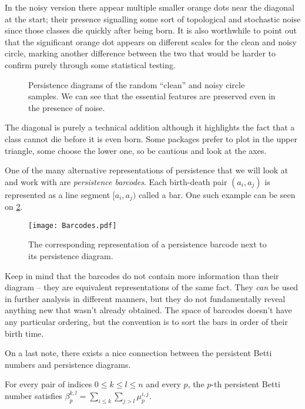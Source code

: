In the noisy version there appear multiple smaller orange dots near the diagonal at the start; their presence signalling some sort of topological and stochastic noise since those classes die quickly after being born. It is also worthwhile to point out that the significant orange dot appears on different scales for the clean and noisy circle, marking another difference between the two that would be harder to confirm purely through some statistical testing.

\begin{figure}
    \centering
    \qquad
    \caption{Persistence diagrams of the random ``clean'' and noisy circle samples. We can see that the essential features are preserved even in the presence of noise.}
    \label{fig:clean_noisy_homologies}
\end{figure}

The diagonal is purely a technical addition although it highlights the fact that a class cannot die before it is even born. Some packages prefer to plot in the upper triangle, some choose the lower one, so be cautious and look at the axes.

One of the many alternative representations of persistence that we will look at and work with are \textit{persistence barcodes}. Each birth-death pair $(a_{i}, a_{j})$ is represented as a line segment $[a_{i}, a_{j})$ called a bar. One such example can be seen on \ref{fig:barcodes}.

\begin{figure}[h!]
  \centering
  \texttt{[image: Barcodes.pdf]}
  \caption{The corresponding representation of a persistence barcode next to its persistence diagram.}
  \label{fig:barcodes}
\end{figure}

Keep in mind that the barcodes do not contain more information than their diagram -- they are equivalent representations of the same fact. They \textit{can} be used in further analysis in different manners, but they do not fundamentally reveal anything new that wasn't already obtained. The space of barcodes doesn't have any particular ordering, but the convention is to sort the bars in order of their birth time.

On a last note, there exists a nice connection between the persistent Betti numbers and persistence diagrams.
\begin{theorem}
  For every pair of indices $0 \leq k \leq l \leq n$ and every $p$, the $p$-th persistent Betti number satisfies $\beta_{p}^{k,l} = \sum_{i \leq k}\sum_{j > l}\mu^{i,j}_{p}$.
\end{theorem}

